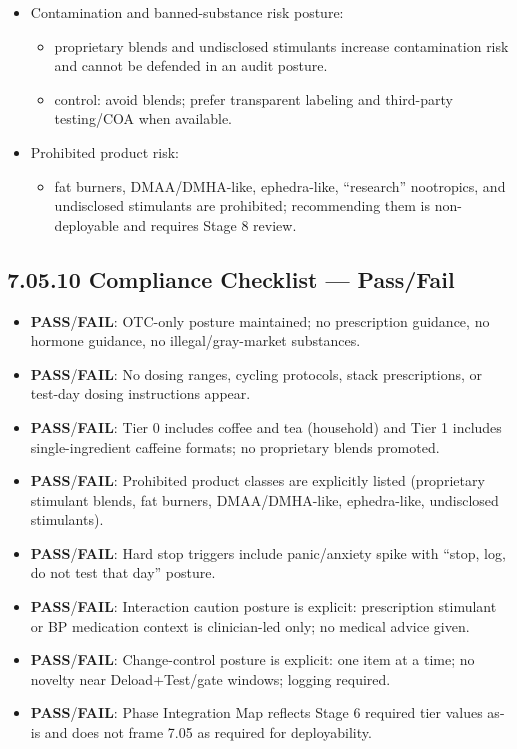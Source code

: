 \documentclass[10pt]{article}
\begin{document}
\begin{itemize}
\begin{itemize}
  \end{itemize}
\item Contamination and banned-substance risk posture:
  \begin{itemize}
  \item proprietary blends and undisclosed stimulants increase contamination risk and cannot be defended in an audit posture.
  \item control: avoid blends; prefer transparent labeling and third-party testing/COA when available.
  \end{itemize}
\item Prohibited product risk:
  \begin{itemize}
  \item fat burners, DMAA/DMHA-like, ephedra-like, “research” nootropics, and undisclosed stimulants are prohibited; recommending them is non-deployable and requires Stage 8 review.
  \end{itemize}
\end{itemize}

\subsection*{7.05.10 Compliance Checklist — Pass/Fail}
{}

\begin{itemize}
\item \textbf{PASS}/\textbf{FAIL}: OTC-only posture maintained; no prescription guidance, no hormone guidance, no illegal/gray-market substances.
\item \textbf{PASS}/\textbf{FAIL}: No dosing ranges, cycling protocols, stack prescriptions, or test-day dosing instructions appear.
\item \textbf{PASS}/\textbf{FAIL}: Tier 0 includes coffee and tea (household) and Tier 1 includes single-ingredient caffeine formats; no proprietary blends promoted.
\item \textbf{PASS}/\textbf{FAIL}: Prohibited product classes are explicitly listed (proprietary stimulant blends, fat burners, DMAA/DMHA-like, ephedra-like, undisclosed stimulants).
\item \textbf{PASS}/\textbf{FAIL}: Hard stop triggers include panic/anxiety spike with “stop, log, do not test that day” posture.
\item \textbf{PASS}/\textbf{FAIL}: Interaction caution posture is explicit: prescription stimulant or BP medication context is clinician-led only; no medical advice given.
\item \textbf{PASS}/\textbf{FAIL}: Change-control posture is explicit: one item at a time; no novelty near Deload+Test/gate windows; logging required.
\item \textbf{PASS}/\textbf{FAIL}: Phase Integration Map reflects Stage 6 required tier values as-is and does not frame 7.05 as required for deployability.
\end{itemize}
\end{document}
